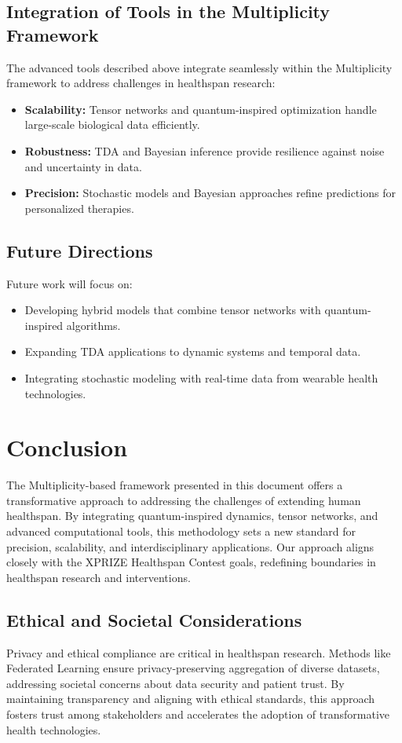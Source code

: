 \documentclass{article}
\theoremstyle{plain}
\begin{document}
\subsection{Integration of Tools in the Multiplicity Framework}
The advanced tools described above integrate seamlessly within the Multiplicity framework to address challenges in healthspan research:
\begin{itemize}
    \item \textbf{Scalability:} Tensor networks and quantum-inspired optimization handle large-scale biological data efficiently.
    \item \textbf{Robustness:} TDA and Bayesian inference provide resilience against noise and uncertainty in data.
    \item \textbf{Precision:} Stochastic models and Bayesian approaches refine predictions for personalized therapies.
\end{itemize}

\subsection{Future Directions}
Future work will focus on:
\begin{itemize}
    \item Developing hybrid models that combine tensor networks with quantum-inspired algorithms.
    \item Expanding TDA applications to dynamic systems and temporal data.
    \item Integrating stochastic modeling with real-time data from wearable health technologies.
\end{itemize}


\section{Conclusion}
\label{sec:conclusion}

The Multiplicity-based framework presented in this document offers a transformative approach to addressing the challenges of extending human healthspan. By integrating quantum-inspired dynamics, tensor networks, and advanced computational tools, this methodology sets a new standard for precision, scalability, and interdisciplinary applications. Our approach aligns closely with the XPRIZE Healthspan Contest goals, redefining boundaries in healthspan research and interventions.

\subsection{Ethical and Societal Considerations}
Privacy and ethical compliance are critical in healthspan research. Methods like Federated Learning ensure privacy-preserving aggregation of diverse datasets, addressing societal concerns about data security and patient trust. By maintaining transparency and aligning with ethical standards, this approach fosters trust among stakeholders and accelerates the adoption of transformative health technologies.
\end{document}

